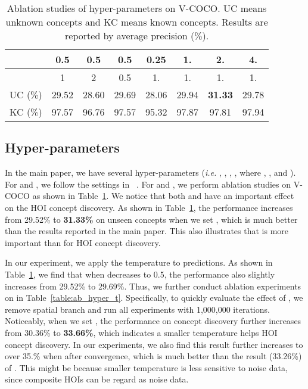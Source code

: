 \documentclass[runningheads]{llncs}
\newcommand{\ie}{\textit{i.e. }}
\begin{document}
\begin{table}[tp]
\setlength\tabcolsep{4pt}
\small
\caption{Ablation studies of hyper-parameters on V-COCO. UC means unknown concepts and KC means known concepts. Results are reported by average precision (\%).}
\label{table:ab_hyper}
\centering

\begin{tabular}{@{}l|c|cccccc@{}}
\hline 
 & 0.5 & 0.5 & 0.5 & 0.25 & 1. & 2. & 4.\\
\hline
 & 1 & 2 & 0.5 & 1. & 1. & 1. & 1.\\
\hline
UC (\%) & 29.52 & 28.60 & 29.69 & 28.06 & 29.94 & {\bf 31.33} & 29.78\\
KC (\%) & 97.57 & 96.76 & 97.57 & 95.32 & 97.87 & 97.81 & 97.94\\

\hline 
\end{tabular}

\end{table}



\subsection{Hyper-parameters}

In the main paper, we have several hyper-parameters (\ie , , , , where , ,  and ). For  and , we follow the settings in ~\cite{hou2020visual}. For  and , we perform ablation studies on V-COCO as shown in Table~\ref{table:ab_hyper}. We notice that both  and  have an important effect on the HOI concept discovery. As shown in Table~\ref{table:ab_hyper}, the performance increases from 29.52\% to {\bf 31.33\%} on unseen concepts when we set , which is much better than the results reported in the main paper. This also illustrates that  is more important than  for HOI concept discovery.

In our experiment, we apply the temperature  to predictions. As shown in Table~\ref{table:ab_hyper}, we find that when  decreases to 0.5, the performance also slightly increases from 29.52\% to 29.69\%. Thus, we further conduct ablation experiments on  in Table~\ref{table:ab_hyper_t}. Specifically, to quickly evaluate the effect of , we remove spatial branch and run all experiments with 1,000,000 iterations. Noticeably, when we set , the performance on concept discovery further increases from 30.36\% to {\bf 33.66\%}, which indicates a smaller temperature helps HOI concept discovery. In our experiments, we also find this result further increases to over 35.\% when  after convergence, which is much better than the result (33.26\%) of . This might be because smaller temperature is less sensitive to noise data, since composite HOIs can be regard as noise data. 
\end{document}
